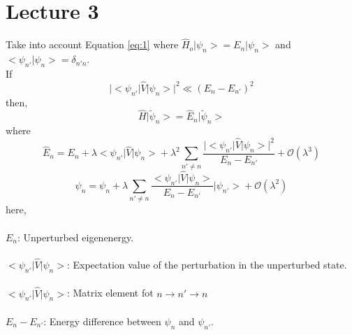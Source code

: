 \documentclass[12pt]{article}
\begin{document}
\newpage
\section{Lecture 3}
Take into account Equation \ref{eq:1} where $\hat{H}_o\big|\psi_n\big> = E_n\big|\psi_n\big>$ and $\big<\psi_{n'}\big|\psi_{n}\big> = \delta_{n'n}$.\\

If
\[ \big|\big<\psi_{n'}\big|\hat{V}\big|\psi_n\big>\big|^2 \ll (E_n - E_{n'})^2\]
then, 
\begin{equation*}
	\hat{H}\big|\tilde{\psi}_n\big> = \hat{E}_n \big|\tilde{\psi}_n \big>
\end{equation*}
where 
\begin{equation*}
	\hat{E}_n = E_n + \lambda \big<\psi_{n'}\big|\hat{V}\big|\psi_n\big> + \lambda^2 \sum_{n'\neq n}
	\frac{\big|\big<\psi_{n'}\big|\hat{V}\big|\psi_n\big>\big|^2}{E_n - E_{n'}} + \mathcal{O}(\lambda^3)
\end{equation*}
\begin{equation*}
	\psi_n = \psi_n + \lambda \sum_{n'\neq n} \frac{\big<\psi_{n'}\big|\hat{V}\big|\psi_n\big>}
	{E_n - E_{n'}}\big|\psi_{n'}\big> + \mathcal{O}(\lambda^2)
\end{equation*}
here,\\
\\
$E_n$: Unperturbed eigenenergy.\\
\\
$ \big<\psi_{n'}\big|\hat{V}\big|\psi_n\big>$: Expectation value of the perturbation in the
unperturbed state.\\
\\
$\big<\psi_{n'}\big|\hat{V}\big|\psi_n\big> $: Matrix element fot $n\rightarrow n' \rightarrow n$\\
\\
$E_n - E_{n'}$: Energy difference between $\psi_n$ and $\psi_{n'}$. 
\end{document}
